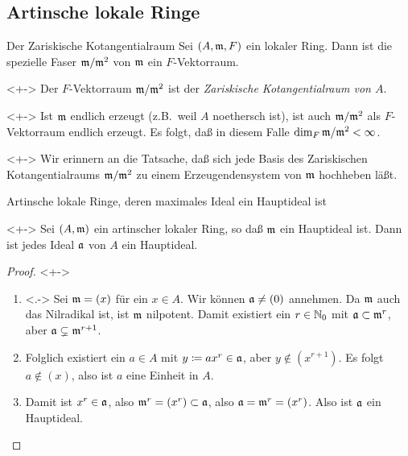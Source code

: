 \subsection{Artinsche lokale Ringe}

\begin{frame}{Der Zariskische Kotangentialraum}
	Sei \((A, \mathfrak{m}, F)\) ein lokaler Ring. Dann ist
	die spezielle Faser \(\mathfrak{m}/\mathfrak{m}^2\) von \(\mathfrak{m}\) ein \(F\)-Vektorraum.
	\begin{definition}<+->
		Der \(F\)-Vektorraum \(\mathfrak{m}/\mathfrak{m}^2\) ist der
		\emph{Zariskische Kotangentialraum von \(A\)}.
	\end{definition}
	\begin{visibleenv}<+->
		Ist \(\mathfrak{m}\) endlich erzeugt (z.B.~weil \(A\) noethersch ist),
		ist auch \(\mathfrak{m}/\mathfrak{m}^2\) als \(F\)-Vektorraum endlich erzeugt.
		Es folgt, daß in diesem Falle \(\dim_F \mathfrak{m}/\mathfrak{m}^2 < \infty\).
	\end{visibleenv}
	
	\begin{visibleenv}<+->
		Wir erinnern an die Tatsache, daß sich jede Basis des Zariskischen
		Kotangentialraums \(\mathfrak{m}/\mathfrak{m}^2\) zu einem Erzeugendensystem von \(\mathfrak{m}\)
		hochheben läßt.
	\end{visibleenv}
\end{frame}

\begin{frame}{Artinsche lokale Ringe, deren maximales Ideal ein Hauptideal ist}
	\begin{lemma}<+->
		Sei \((A, \mathfrak{m})\) ein artinscher lokaler Ring, so daß \(\mathfrak{m}\) ein
		Hauptideal ist. Dann ist jedes Ideal \(\mathfrak{a}\) von \(A\) ein Hauptideal.
	\end{lemma}
	\begin{proof}<+->
		\begin{enumerate}[<+->]
		\item<.->
			Sei \(\mathfrak{m} = (x)\) für ein \(x \in A\).
			Wir können \(\mathfrak{a} \neq (0)\) annehmen. Da \(\mathfrak{m}\) auch das Nilradikal
			ist, ist \(\mathfrak{m}\) nilpotent. Damit existiert ein \(r \in \mathbb N_0\) mit
			\(\mathfrak{a} \subset \mathfrak{m}^r\), aber \(\mathfrak{a} \subsetneq \mathfrak{m}^{r + 1}\).
		\item
			Folglich existiert ein \(a \in A\) mit \(y \coloneqq ax^r \in \mathfrak{a}\), aber
			\(y \notin (x^{r + 1})\). Es folgt \(a \notin (x)\), also ist \(a\) eine Einheit in
			\(A\).
		\item
			Damit ist \(x^r \in \mathfrak{a}\), also \(\mathfrak{m}^r = (x^r) \subset \mathfrak{a}\),
			also \(\mathfrak{a} = \mathfrak{m}^r = (x^r)\). Also ist \(\mathfrak{a}\) ein Hauptideal.
			\qedhere
		\end{enumerate}
	\end{proof}
\end{frame}

